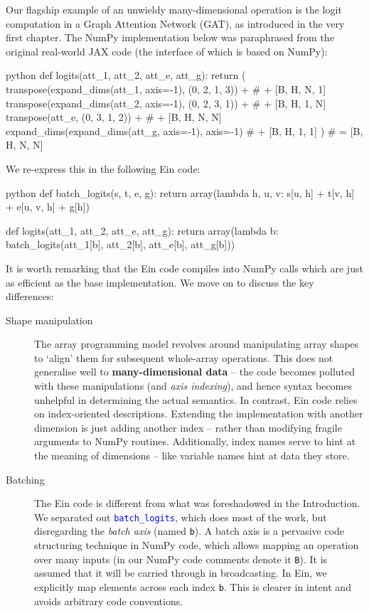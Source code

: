 Our flagship example of an unwieldy many-dimensional operation is the logit computation in a Graph Attention Network (GAT), as introduced in the very first chapter. The NumPy implementation below was paraphrased from the original real-world JAX code (the interface of which is based on NumPy):
\begin{center}
\begin{cminted}{python}
def logits(att_1, att_2, att_e, att_g):
    return (
        transpose(expand_dims(att_1, axis=-1), (0, 2, 1, 3)) +  # + [B, H, N, 1]
        transpose(expand_dims(att_2, axis=-1), (0, 2, 3, 1)) +  # + [B, H, 1, N]
        transpose(att_e, (0, 3, 1, 2)) +                        # + [B, H, N, N]
        expand_dims(expand_dims(att_g, axis=-1), axis=-1)       # + [B, H, 1, 1]
    )                                                           # = [B, H, N, N]
\end{cminted}
\end{center}
We re-express this in the following Ein code:
\begin{center}
\begin{cminted}{python}
def batch_logits(s, t, e, g):
    return array(lambda h, u, v: s[u, h] + t[v, h] + e[u, v, h] + g[h])

def logits(att_1, att_2, att_e, att_g):
    return array(lambda b: batch_logits(att_1[b], att_2[b], att_e[b], att_g[b]))
\end{cminted}
\end{center}
It is worth remarking that the Ein code compiles into NumPy calls which are just as efficient as the base implementation. We move on to discuss the key differences:

\begin{description}
    \item[Shape manipulation] The array programming model revolves around manipulating array shapes to `align' them for subsequent whole-array operations. This does not generalise well to \textbf{many-dimensional data} -- the code becomes polluted with these manipulations (and \textit{axis indexing}), and hence syntax becomes unhelpful in determining the actual semantics. In contrast, Ein code relies on index-oriented descriptions. Extending the implementation with another dimension is just adding another index -- rather than modifying fragile arguments to NumPy routines. Additionally, index names serve to hint at the meaning of dimensions -- like variable names hint at data they store.
    \item[Batching] The Ein code is different from what was foreshadowed in the Introduction. We separated out \textcolor{blue}{\texttt{batch\_logits}}, which does most of the work, but disregarding the \textit{batch axis} (named \texttt{b}). A batch axis is a pervasive code structuring technique in NumPy code, which allows mapping an operation over many inputs (in our NumPy code comments denote it \texttt{B}). It is assumed that it will be carried through in broadcasting. In Ein, we explicitly map elements across each index \texttt{b}. This is clearer in intent and avoids arbitrary code conventions.
\end{description}

